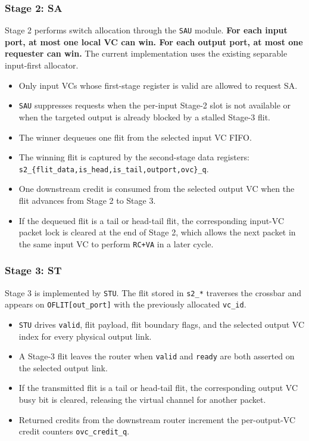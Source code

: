 \documentclass[11pt,a4paper]{article}
\begin{document}
\subsubsection{Stage 2: SA}
Stage 2 performs switch allocation through the \texttt{SAU} module. \textbf{For each input port, at most one local VC can win. For each output port, at most one requester can win.} The current implementation uses the existing separable input-first allocator.
\begin{itemize}
    \item Only input VCs whose first-stage register is valid are allowed to request SA.
    \item \texttt{SAU} suppresses requests when the per-input Stage-2 slot is not available or when the targeted output is already blocked by a stalled Stage-3 flit.
    \item The winner dequeues one flit from the selected input VC FIFO.
    \item The winning flit is captured by the second-stage data registers:\\
    \texttt{s2\_\{flit\_data,is\_head,is\_tail,outport,ovc\}\_q}.
    \item One downstream credit is consumed from the selected output VC when the flit advances from Stage 2 to Stage 3.
    \item If the dequeued flit is a tail or head-tail flit, the corresponding input-VC packet lock is cleared at the end of Stage 2, which allows the next packet in the same input VC to perform \texttt{RC+VA} in a later cycle.
\end{itemize}

\subsubsection{Stage 3: ST}
Stage 3 is implemented by \texttt{STU}. The flit stored in \texttt{s2\_*} traverses the crossbar and appears on \texttt{OFLIT[out\_port]} with the previously allocated \texttt{vc\_id}.
\begin{itemize}
    \item \texttt{STU} drives \texttt{valid}, flit payload, flit boundary flags, and the selected output VC index for every physical output link.
    \item A Stage-3 flit leaves the router when \texttt{valid} and \texttt{ready} are both asserted on the selected output link.
    \item If the transmitted flit is a tail or head-tail flit, the corresponding output VC busy bit is cleared, releasing the virtual channel for another packet.
    \item Returned credits from the downstream router increment the per-output-VC credit counters \texttt{ovc\_credit\_q}.
\end{itemize}
\end{document}
